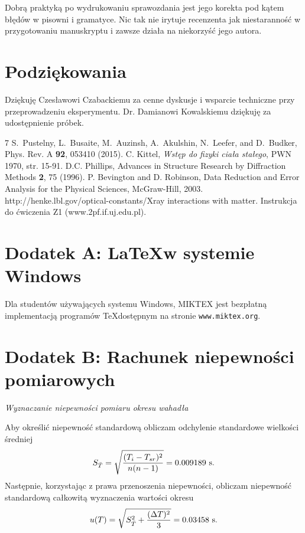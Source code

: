 \documentclass[twocolumn, a4paper, polish, 10pt]{article}
\begin{document}
Dobrą praktyką po wydrukowaniu sprawozdania jest jego korekta pod kątem błędów w pisowni i gramatyce. Nic tak nie irytuje recenzenta jak niestaranność w przygotowaniu manuskryptu i zawsze działa na niekorzyść jego autora.
\section*{Podziękowania}
Dziękuję Czesławowi Czabackiemu za cenne dyskusje i wsparcie techniczne przy przeprowadzeniu eksperymentu. Dr. Damianowi Kowalskiemu dziękuję za udostępnienie próbek.

\begin{thebibliography}{7}
S.~Pustelny, L.~Busaite, M.~Auzinsh, A.~Akulshin, N.~Leefer, and D.~Budker, Phys. Rev. A \textbf{92}, 053410 (2015).
C. Kittel, \emph{Wstęp do fizyki ciała stałego}, PWN 1970, str. 15-91.
D.C. Phillips, Advances in Structure Research by Diffraction Methods \textbf{2}, 75 (1996).
P. Bevington and D. Robinson, Data Reduction and Error Analysis for the Physical Sciences, McGraw-Hill, 2003.
http://henke.lbl.gov/optical-constants/Xray interactions with matter.
 Instrukcja do ćwiczenia Z1 (www.2pf.if.uj.edu.pl).
\end{thebibliography}

\section*{Dodatek A: \LaTeX\@  w systemie Windows}
\label{dod:latex}
Dla studentów używających systemu Windows, MIKTEX jest bezpłatną implementacją programów \TeX\@ dostępnym na stronie \texttt{www.miktex.org}.
\section*{Dodatek B: Rachunek niepewności pomiarowych}
\begin{center}
\emph{Wyznaczanie niepewności pomiaru okresu wahadła}
\end{center}
\noindent Aby określić niepewność standardową obliczam odchylenie standardowe wielkości średniej
\begin{displaymath}
    S_{\bar{T}}=\sqrt{\frac{(T_i-T_{sr})^2}{n(n-1)}}=0.009189~\rm{s}.
\end{displaymath}
Następnie, korzystając z prawa przenoszenia niepewności, obliczam niepewność standardową całkowitą wyznaczenia wartości okresu
\begin{displaymath}
    u(T)=\sqrt{S^2_{\bar{T}}+\frac{(\Delta T)^2}{3}}=0.03458~\rm{s}.
\end{displaymath}
\end{document}
